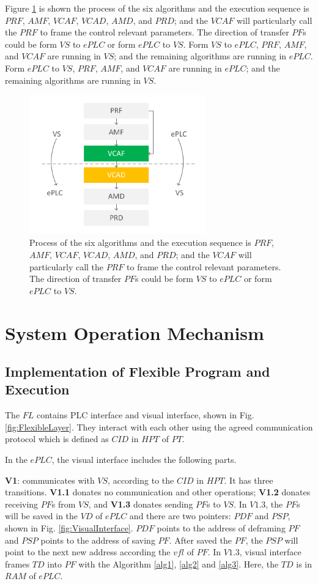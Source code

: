 \documentclass[journal,UTF8]{IEEEtran}
\begin{document}
Figure \ref{fig:Algorithms} is shown the process of the six algorithms and the execution sequence is $PRF$, $AMF$, $VCAF$, $VCAD$, $AMD$, and $PRD$; and the $VCAF$ will particularly call the $PRF$ to frame the control relevant parameters. The direction of transfer $PF$s could be form $VS$ to $ePLC$ or form $ePLC$ to $VS$. Form $VS$ to $ePLC$, $PRF$, $AMF$, and $VCAF$ are running in $VS$; and the remaining algorithms are running in $ePLC$. Form $ePLC$ to $VS$, $PRF$, $AMF$, and $VCAF$ are running in $ePLC$; and the remaining algorithms are running in $VS$.

\begin{figure}
	\centering
	\includegraphics[width=3in]{fig/Algorithms.pdf}
	\caption{ Process of the six algorithms and the execution sequence is $PRF$, $AMF$, $VCAF$, $VCAD$, $AMD$, and $PRD$; and the $VCAF$ will particularly call the $PRF$ to frame the control relevant parameters. The direction of transfer $PF$s could be form $VS$ to $ePLC$ or form $ePLC$ to $VS$.}
	\label{fig:Algorithms}
\end{figure}

\section{System Operation Mechanism}
\label{Execution}
\subsection{Implementation of Flexible Program and Execution}
The $FL$ contains PLC interface and visual interface, shown in Fig. \ref{fig:FlexibleLayer}. They interact with each other using the agreed communication protocol which is defined as $CID$ in $HPT$ of $PT$. 

In the $ePLC$, the visual interface includes the following parts.

\textbf{V1}: communicates with $VS$, according to the $CID$ in $HPT$. It has three transitions. \textbf{V1.1} donates no communication and other operations; \textbf{V1.2} donates receiving $PF$s from $VS$, and \textbf{V1.3} donates sending $PF$s to $VS$. In $V1.3$, the $PF$s will be saved in the $VD$ of $ePLC$ and there are two pointers: $PDF$ and $PSP$, shown in Fig. \ref{fig:VisualInterface}. $PDF$ points to the address of deframing $PF$ and $PSP$ points to the address of saving $PF$. After saved the $PF$, the $PSP$ will point to the next new address according the $vfl$ of $PF$. In $V1.3$, visual interface frames $TD$ into $PF$ with the Algorithm \ref{alg1}, \ref{alg2} and \ref{alg3}. Here, the $TD$ is in $RAM$ of $ePLC$.
\end{document}
